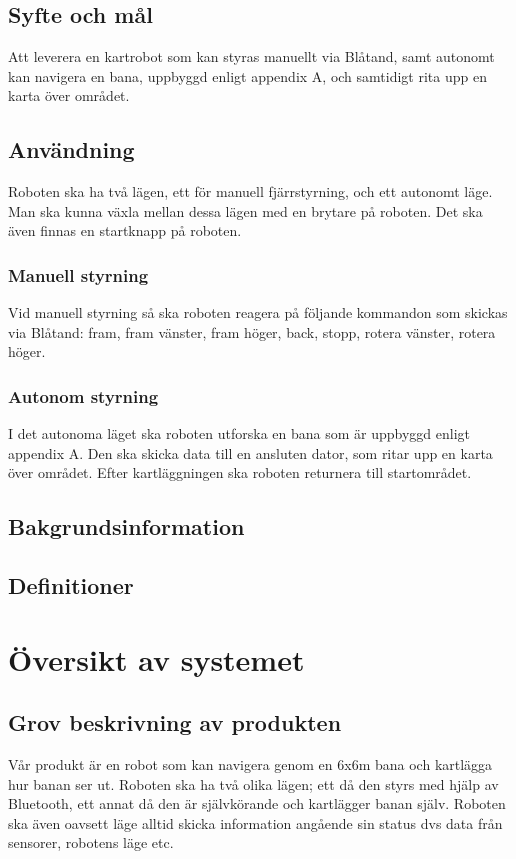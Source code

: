 \documentclass[a4paper,11pt]{article}
\begin{document}
\subsection{Syfte och mål}
Att leverera en kartrobot som kan styras manuellt via Blåtand, samt autonomt kan navigera en bana, uppbyggd enligt appendix A, och samtidigt rita upp en karta över området.  
\subsection{Användning}
Roboten ska ha två lägen, ett för manuell fjärrstyrning, och ett autonomt läge. Man ska kunna växla mellan dessa lägen med en brytare på roboten. Det ska även finnas en startknapp på roboten. 
\subsubsection{Manuell styrning}
Vid manuell styrning så ska roboten reagera på följande kommandon som skickas via Blåtand: fram, fram vänster, fram höger, back, stopp, rotera vänster, rotera höger. 
\subsubsection{Autonom styrning}
I det autonoma läget ska roboten utforska en bana som är uppbyggd enligt appendix A. Den ska skicka data till en ansluten dator, som ritar upp en karta över området. Efter kartläggningen ska roboten returnera till startområdet. 
\subsection{Bakgrundsinformation}
\subsection{Definitioner}


\section{Översikt av systemet}

\subsection{Grov beskrivning av produkten}
Vår produkt är en robot som kan navigera genom en 6x6m bana och kartlägga hur banan ser ut. Roboten ska ha två olika lägen; ett då den styrs med hjälp av Bluetooth, ett annat då den är självkörande och kartlägger banan själv. Roboten ska även oavsett läge alltid skicka information angående sin status dvs data från sensorer, robotens läge etc. 
\end{document}
